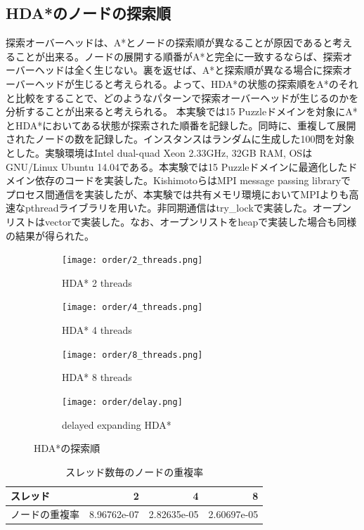 \documentclass{jsarticle}
\begin{document}
\subsection{HDA*のノードの探索順}
探索オーバーヘッドは、A*とノードの探索順が異なることが原因であると考えることが出来る。ノードの展開する順番がA*と完全に一致するならば、探索オーバーヘッドは全く生じない。裏を返せば、A*と探索順が異なる場合に探索オーバーヘッドが生じると考えられる。よって、HDA*の状態の探索順をA*のそれと比較をすることで、どのようなパターンで探索オーバーヘッドが生じるのかを分析することが出来ると考えられる。
本実験では15 Puzzleドメインを対象にA*とHDA*においてある状態が探索された順番を記録した。同時に、重複して展開されたノードの数を記録した。インスタンスはランダムに生成した100問を対象とした。実験環境はIntel dual-quad Xeon 2.33GHz, 32GB RAM, OSはGNU/Linux Ubuntu 14.04である。本実験では15 Puzzleドメインに最適化したドメイン依存のコードを実装した。KishimotoらはMPI message passing libraryでプロセス間通信を実装したが、本実験では共有メモリ環境においてMPIよりも高速なpthreadライブラリを用いた。非同期通信はtry\_lockで実装した。オープンリストはvectorで実装した。なお、オープンリストをheapで実装した場合も同様の結果が得られた。


\begin{figure}
	\begin{subfigure}{0.4\columnwidth}
		\centering
		\texttt{[image: order/2\_threads.png]}
		\caption{HDA* 2 threads}
		\label{fig:order_2_threads}
	\end{subfigure}
	\begin{subfigure}{0.4\columnwidth}
		\centering
		\texttt{[image: order/4\_threads.png]}
		\caption{HDA* 4 threads}
		\label{fig:order_4_threads}
	\end{subfigure}
	\begin{subfigure}{0.4\columnwidth}
		\centering
		\texttt{[image: order/8\_threads.png]}
		\caption{HDA* 8 threads}
		\label{fig:order_8_threads}
	\end{subfigure}
	\begin{subfigure}{0.4\columnwidth}
		\centering
		\texttt{[image: order/delay.png]}
		\caption{delayed expanding HDA*}
		\label{fig:order_delay}
	\end{subfigure}
	\caption{HDA*の探索順}
	\label{fig:hdastar_orders}
\end{figure}%

\begin{table}
	\centering
	\begin{tabular}{lrrr} \hline
		スレッド       & 2 & 4 & 8 \\ \hline
		ノードの重複率 & 8.96762e-07 & 2.82635e-05 & 2.60697e-05 \\ \hline
	\end{tabular}
	\caption{スレッド数毎のノードの重複率}
	\label{hdastar_duplication}
\end{table}
\end{document}
